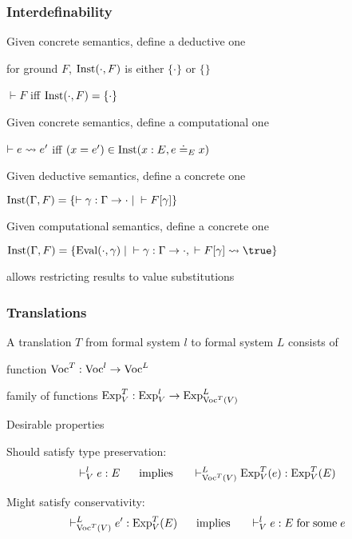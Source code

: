 \begin{frame}\frametitle{Interdefinability}
\begin{blockitems}{Given concrete semantics, define a deductive one}
\item for ground $F$, $\mathrm{Inst}(\cdot,F)$ is either $\{\cdot\}$ or $\{\}$
\item $\vdash F$ iff $\mathrm{Inst}(\cdot, F)=\{\cdot\}$
\end{blockitems}

\begin{blockitems}{Given concrete semantics, define a computational one}
\item $\vdash e\rightsquigarrow e'$ iff $(x=e')\in\mathrm{Inst}(x:E, e\doteq_E x)$
\end{blockitems}

\begin{blockitems}{Given deductive semantics, define a concrete one}
\item $\mathrm{Inst}(\Gamma,F)=\{\vdash \gamma:\Gamma\to\cdot \;|\;\vdash F[\gamma]\}$
\end{blockitems}

\begin{blockitems}{Given computational semantics, define a concrete one}
\item $\Inst(\Gamma,F)=\{\Eval(\cdot,\gamma) \;|\;\vdash \gamma:\Gamma\to\cdot, \;\vdash F[\gamma]\rewrites \true\}$
\item allows restricting results to value substitutions
\end{blockitems}
\end{frame}


\begin{frame}\frametitle{Translations}
\begin{blockitems}{A translation $T$ from formal system $l$ to formal system $L$ consists of}
\item function $\mathrm{Voc}^T:\mathrm{Voc}^l\to\mathrm{Voc}^L$
\item family of functions $\mathrm{Exp}^T_V:\mathrm{Exp}^l_V\to\mathrm{Exp}^L_{\mathrm{Voc}^T(V)}$
\end{blockitems}

\begin{blockitems}{Desirable properties}
\item Should satisfy type preservation:
\[\vdash^l_V e:E \hspace*{.5cm}\;\mathrm{implies}\;\hspace*{.5cm} \vdash^L_{\mathrm{Voc}^T(V)} \mathrm{Exp}^T_V(e):\mathrm{Exp}^T_V(E)\]
\item Might satisfy conservativity: 
\[\vdash^L_{\mathrm{Voc}^T(V)} e':\mathrm{Exp}^T_V(E) \hspace*{.5cm}\;\mathrm{implies}\;\hspace*{.5cm} \vdash^l_V e:E \;\mathrm{for}\;\mathrm{some}\; e\]
\end{blockitems}
\end{frame}

